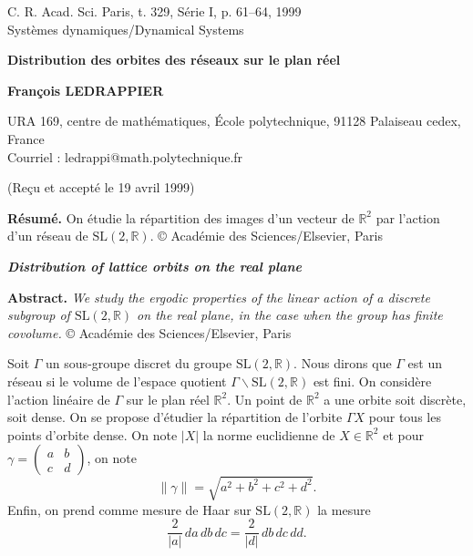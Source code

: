 \documentclass[11pt]{article}
\theoremstyle{remark}
\newcommand{\R}{\mathbb{R}}
\newcommand{\SL}{\mathrm{SL}}
\begin{document}
\begin{center}
{\small C. R. Acad. Sci. Paris, t. 329, Série I, p. 61--64, 1999\\
Systèmes dynamiques/Dynamical Systems}

\vspace{1.5cm}

{\LARGE\bfseries Distribution des orbites des réseaux sur le plan réel}

\vspace{0.5cm}

{\large\bfseries François LEDRAPPIER}

\vspace{0.3cm}

URA 169, centre de mathématiques, École polytechnique, 91128 Palaiseau cedex, France\\
Courriel : ledrappi@math.polytechnique.fr

\vspace{0.3cm}

(Reçu et accepté le 19 avril 1999)
\end{center}

\vspace{0.8cm}

\noindent\textbf{Résumé.}\quad
On étudie la répartition des images d'un vecteur de $\R^2$ par l'action d'un réseau de
$\SL(2,\R)$. \copyright{} Académie des Sciences/Elsevier, Paris

\vspace{0.6cm}

\begin{center}
\textbf{\emph{Distribution of lattice orbits on the real plane}}
\end{center}

\noindent\textbf{Abstract.}\quad
\emph{We study the ergodic properties of the linear action of a discrete subgroup of $\SL(2,\R)$
on the real plane, in the case when the group has finite covolume.}
\copyright{} Académie des Sciences/Elsevier, Paris

\vspace{0.8cm}

Soit $\Gamma$ un sous-groupe discret du groupe $\SL(2,\R)$. Nous dirons que $\Gamma$ est un réseau si le volume de l'espace quotient $\Gamma\backslash\SL(2,\R)$ est fini. On considère l'action linéaire de $\Gamma$ sur le plan réel $\R^2$. Un point de $\R^2$ a une orbite soit discrète, soit dense. On se propose d'étudier la répartition de l'orbite $\Gamma X$ pour tous les points d'orbite dense. On note $|X|$ la norme euclidienne de $X\in\R^2$ et pour
$\gamma=\begin{pmatrix}a&b\\ c&d\end{pmatrix}$, on note
\[
\|\gamma\|=\sqrt{a^2+b^2+c^2+d^2}.
\]
Enfin, on prend comme mesure de Haar sur $\SL(2,\R)$ la mesure
\[
\frac{2}{|a|}\,da\,db\,dc=\frac{2}{|d|}\,db\,dc\,dd.
\]
\end{document}
